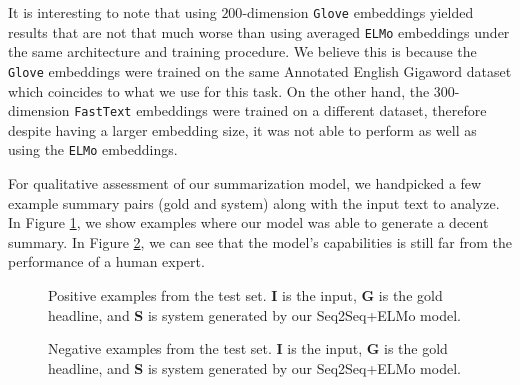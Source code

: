 It is interesting to note that using $200$-dimension \texttt{Glove} embeddings yielded results that are not that much worse than using averaged \texttt{ELMo} embeddings under the same architecture and training procedure. We believe this is because the \texttt{Glove} embeddings were trained on the same Annotated English Gigaword dataset which coincides to what we use for this task. On the other hand, the $300$-dimension \texttt{FastText} embeddings were trained on a different dataset, therefore despite having a larger embedding size, it was not able to perform as well as using the \texttt{ELMo} embeddings.

For qualitative assessment of our summarization model, we handpicked a few example summary pairs (gold and system) along with the input text to analyze. In Figure \ref{fig: examples_good}, we show examples where our model was able to generate a decent summary.  In Figure \ref{fig: examples_bad}, we can see that the model's capabilities is still far from the performance of a human expert. 


\begin{figure}[ht]
\caption{Positive examples from the test set. \textbf{I} is the input, \textbf{G} is the gold headline, and \textbf{S} is system generated by our Seq2Seq+ELMo model.}
\label{fig: examples_good}
\noindent{}
\end{figure}

\begin{figure}[ht]
\caption{Negative examples from the test set. \textbf{I} is the input, \textbf{G} is the gold headline, and \textbf{S} is system generated by our Seq2Seq+ELMo model.}
\label{fig: examples_bad}
\noindent{}
\end{figure}


